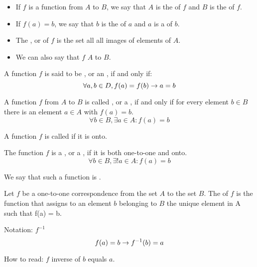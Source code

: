         \begin{itemize}
            \item If $f$ is a function from $A$ to $B$, we say that $A$ is the 
                of $f$ and $B$ is the  of $f$.
            \item If $f(a) = b$, we say that $b$ is the  of $a$ and $a$ is a
             of $b$.
            \item The , or  of $f$ is the set all all images of
                elements of $A$.
            \item We can also say that $f$  $A$ to $B$.
        \end{itemize}

        \par A function $f$ is said to be , or an , if and
        only if:
        \begin{equation}
            \forall a, b \in D, f(a) = f(b) \rightarrow a = b
        \end{equation}


        \par A function $f$ from $A$ to $B$ is called , or a , if
        and only if for every element $b \in B$ there is an element $a \in A$ with $f(a) = b$.
        \begin{equation}
            \forall b \in B, \exists a \in A: f(a) = b
        \end{equation}
        \par A function $f$ is called  if it is onto.

        \par The function $f$ is a , or a , if
        it is both one-to-one and onto.
        \begin{equation}
            \forall b \in B, \exists! a \in A: f(a) = b
        \end{equation}
        \par We say that such a function is .

        \par Let $f$ be a one-to-one correspondence from the set $A$ to the set $B$. The
         of $f$ is the function that assigns to an element $b$ belonging
        to $B$ the unique element in A such that f(a) = b.
        \par Notation: $f^{-1}$
        \begin{equation}
            f(a) = b \rightarrow f^{-1}(b) = a
        \end{equation}
        \par How to read: $f$ inverse of $b$ equals $a$.

